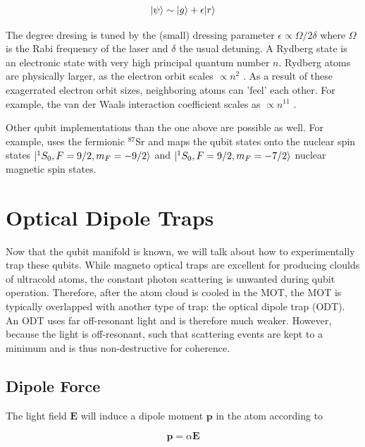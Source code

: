 \begin{equation}\label{eq:RydbergDressing}
	\lvert\psi\rangle \sim \lvert g\rangle + \epsilon \lvert r\rangle
\end{equation}

The degree dresing is tuned by the (small) dressing parameter $\epsilon \propto \Omega / 2\delta$ where $\Omega$ is the Rabi frequency of the laser and $\delta$ the usual detuning. A Rydberg state is an electronic state with very high principal quantum number $n$. Rydberg atoms are physically larger, as the electron orbit scales $\propto n^2$ \cite{Gallagher1994}. As a result of these exagerrated electron orbit sizes, neighboring atoms can 'feel' each other. For example, the van der Waals interaction coefficient scales as $\propto n^{11}$ \cite{Gallagher1994}. 

Other qubit implementations than the one above are possible as well. For example, \cite{Barnes2021} uses the fermionic ${}^{87}$Sr and maps the qubit states onto the nuclear spin states $\lvert{}^1S_0, F=9/2, m_F = -9/2\rangle$ and $\lvert{}^1S_0, F=9/2, m_F = -7/2\rangle$ nuclear magnetic spin states. 


\section{Optical Dipole Traps}\label{sec:OpticalDipoleTrap}

Now that the qubit manifold is known, we will talk about how to experimentally trap these qubits. While magneto optical traps are excellent for producing cloulds of ultracold atoms, the constant photon scattering is unwanted during qubit operation. Therefore, after the atom cloud is cooled in the MOT, the MOT is typically overlapped with another type of trap: the optical dipole trap (ODT). An ODT uses far off-resonant light and is therefore much weaker. However, because the light is off-resonant, such that scattering events are kept to a minimum and is thus non-destructive for coherence. 

\subsection{Dipole Force}\label{sec:DipoleForce}

The light field $\mathbf{E}$ will induce a dipole moment $\mathbf{p}$ in the atom according to 
	
\begin{equation}\label{eq:DipoleMoment}
	\mathbf{p} = \alpha \mathbf{E}
\end{equation}


